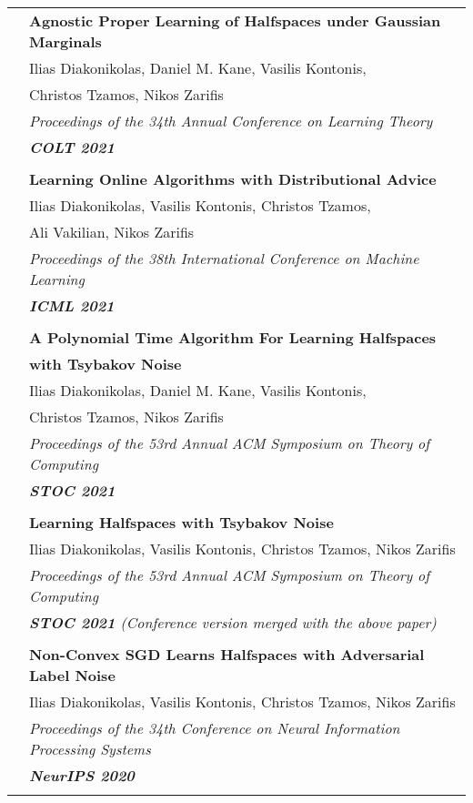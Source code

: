 \documentclass[letterpaper,11pt,oneside]{article}
\begin{document}
\begin{longtable}{@{} l l}
&\textbf{Agnostic Proper Learning of Halfspaces under Gaussian Marginals}\\
& Ilias Diakonikolas, Daniel M. Kane, Vasilis Kontonis,\\
& Christos Tzamos, Nikos Zarifis \\
& \emph{Proceedings of the 34th Annual Conference on Learning Theory} \\
& \emph{\textbf{COLT 2021}} \\
& \\

     &\textbf{Learning Online Algorithms with Distributional Advice}\\
     & Ilias Diakonikolas, Vasilis Kontonis, Christos Tzamos,\\
     & Ali Vakilian, Nikos Zarifis \\
     & \emph{Proceedings of the 38th International Conference on Machine Learning} \\
     & \emph{\textbf{ICML 2021}} \\
     & \\

     &\textbf{A Polynomial Time Algorithm For Learning Halfspaces}\\
     & \textbf{with Tsybakov Noise}\\
     & Ilias Diakonikolas, Daniel M. Kane, Vasilis Kontonis,\\
     & Christos Tzamos, Nikos Zarifis \\
     & \emph{Proceedings of the 53rd Annual ACM Symposium on Theory of Computing}\\
     & \emph{\textbf{STOC 2021}} \\
     & \\

     &\textbf{Learning Halfspaces with Tsybakov Noise}\\
     & Ilias Diakonikolas, Vasilis Kontonis, Christos Tzamos, Nikos Zarifis \\
     & \emph{Proceedings of the 53rd Annual ACM Symposium on Theory of Computing} \\
     & \emph{\textbf{STOC 2021} 
     (Conference version merged with the above paper)
     } \\
     & \\



     &\textbf{Non-Convex SGD Learns Halfspaces with Adversarial Label Noise} \\
     & Ilias Diakonikolas, Vasilis Kontonis, Christos Tzamos, Nikos Zarifis \\
     & \emph{Proceedings of the 34th Conference on Neural Information Processing Systems} \\
     & \emph{\textbf{NeurIPS 2020}} \\
     & \\


\end{longtable}
\end{document}
